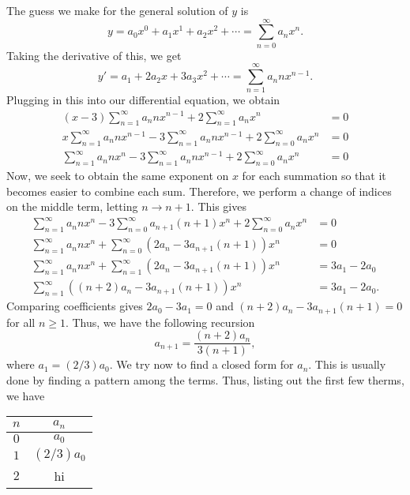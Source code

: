 \begin{soln}
    The guess we make for the general solution of $y$ is
    $$y = a_0 x^0 + a_1 x^1 + a_2 x^2 +\cdots = \sum_{n = 0}^{\infty} a_n x^n.$$
    Taking the derivative of this, we get
    $$y' = a_1+2a_2x + 3a_3x^2 + \cdots = \sum_{n = 1}^{\infty} a_n n x^{n-1}.$$
    Plugging in this into our differential equation, we obtain
    \begin{align*}
        (x-3)\sum_{n = 1}^{\infty} a_n n x^{n-1} + 2\sum_{n = 1}^{\infty} a_n x^n &= 0 \\
        x\sum_{n = 1}^{\infty} a_n n x^{n-1} - 3\sum_{n = 1}^{\infty} a_n n x^{n-1}+2\sum_{n = 0}^{\infty} a_n x^n &= 0 \\
        \sum_{n = 1}^{\infty} a_n n x^{n} - 3\sum_{n = 1}^{\infty} a_n n x^{n-1}+2\sum_{n = 0}^{\infty} a_n x^n & =0
    \end{align*}
    Now, we seek to obtain the same exponent on $x$ for each summation so that
    it becomes easier to combine each sum. Therefore, we perform a \alert{change of
    indices} on the middle term, letting $n \rightarrow n+1$. This gives
    \begin{align*}
        \sum_{n = 1}^{\infty} a_n n x^{n} - 3\sum_{n = 0}^{\infty} a_{n+1} (n+1)x^{n}+2\sum_{n = 0}^{\infty} a_n x^n &= 0\\
        \sum_{n = 1}^{\infty} a_n n x^{n} + \sum_{n = 0}^{\infty} \left(2a_n-3a_{n+1}(n+1)\right)x^n &= 0 \\
        \sum_{n = 1}^{\infty} a_n n x^{n} + \sum_{n = 1}^{\infty} \left(2a_n-3a_{n+1}(n+1)\right)x^n &= 3a_1-2a_0 \\
        \sum_{n = 1}^{\infty}\left((n+2)a_n-3a_{n+1}(n+1)\right)x^n &= 3a_1 - 2a_0.
    \end{align*}
    Comparing coefficients gives $2a_0-3a_1 = 0$ and $(n+2)a_n-3a_{n+1}(n+1) = 0$ for all
    $n \geq 1$. Thus, we have the following recursion $$a_{n+1} = \frac{(n+2)a_n}{3(n+1)},$$
    where $a_1 = (2/3)a_0$. We try now to find a closed form for $a_n$. This
    is usually done by finding a pattern among the terms. Thus, listing out
    the first few therms, we have
    \begin{center}
        \begin{tabular}{| c | c |}
            \hline
            $n$ & $a_n$ \\
            \hline
            $0$ & $a_0$ \\
            $1$ & $(2/3)a_0$ \\
            $2$ & hi \\

\end{tabular}
\end{center}
\end{soln}
